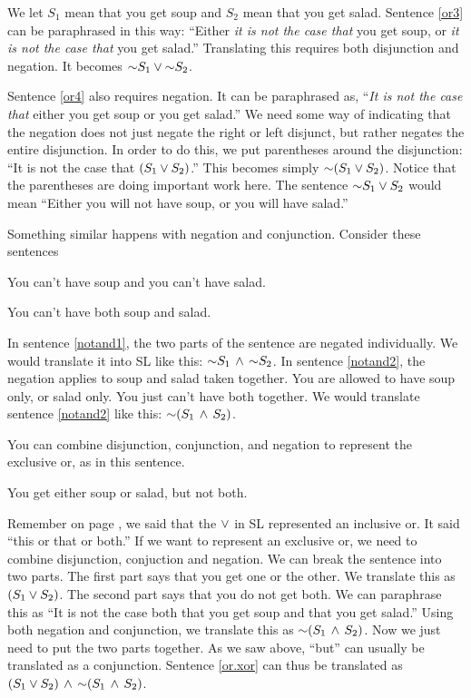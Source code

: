 We let $S_1$ mean that you get soup and $S_2$ mean that you get salad. Sentence \ref{or3} can be paraphrased in this way: ``Either \emph{it is not the case that} you get soup, or \emph{it is not the case that} you get salad.'' Translating this requires both disjunction and negation. It becomes $\mathord{\sim} S_1 \lor \mathord{\sim} S_2$.

Sentence \ref{or4} also requires negation. It can be paraphrased as, ``\emph{It is not the case that} either you get soup or you get salad.'' We need some way of indicating that the negation does not just negate the right or left disjunct, but rather negates the entire disjunction. In order to do this, we put parentheses around the disjunction: ``It is not the case that $(S_1 \lor S_2)$.'' This becomes simply $\mathord{\sim} (S_1 \lor S_2)$. Notice that the parentheses are doing important work here. The sentence $\mathord{\sim} S_1 \lor S_2$ would mean ``Either you will not have soup, or you will have salad.''

Something similar happens with negation and conjunction. Consider these sentences

\begin{earg}
\item[\ex{notand1}] You can't have soup and you can't have salad.
\item[\ex{notand2}] You can't have both soup and salad.
\end{earg}

In sentence \ref{notand1}, the two parts of the sentence are negated individually. We would translate it into SL like this: $\mathord{\sim} S_1 \,\land\, \mathord{\sim} S_2$. In sentence \ref{notand2}, the negation applies to soup and salad taken together. You are allowed to have soup only, or salad only. You just can't have both together. We would translate sentence \ref{notand2} like this: $\mathord{\sim}(S_1 \,\land\, S_2)$.

You can combine disjunction, conjunction, and negation to represent the exclusive or, as in this sentence.

\begin{earg}
\item[\ex{or.xor}] You get either soup or salad, but not both.
\end{earg}

Remember on page \pageref{def:inclusive_or}, we said that the $\lor$ in SL represented an inclusive or. It said ``this or that or both.'' If we want to represent an exclusive or, we need to combine disjunction, conjuction and negation. We can break the sentence into two parts. The first part says that you get one or the other. We translate this as $(S_1 \lor S_2)$. The second part says that you do not get both. We can paraphrase this as ``It is not the case both that you get soup and that you get salad.'' Using both negation and conjunction, we translate this as $\mathord{\sim}(S_1 \,\land\, S_2)$. Now we just need to put the two parts together. As we saw above, ``but'' can usually be translated as a conjunction. Sentence \ref{or.xor} can thus be translated as $(S_1 \lor S_2) \,\land\, \mathord{\sim}(S_1 \,\land\, S_2)$.


